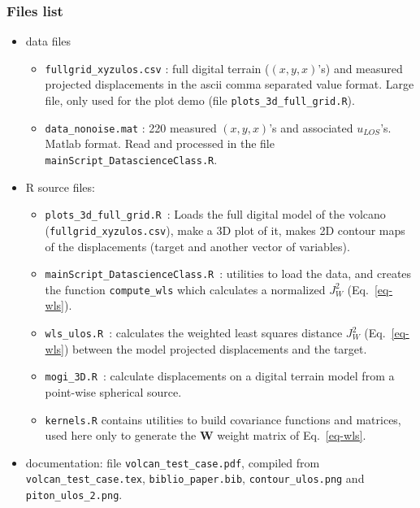 \documentclass[12pt]{article}
\newcommand{\enm}[1]{\ensuremath{#1}\xspace}
\newcommand{\mat}[1]{\enm{\boldsymbol{\mathbf{#1}}}}
\begin{document}
	\subsubsection{Files list}
	\begin{itemize}
	\item data files
	\begin{itemize}
	\item \texttt{fullgrid\_xyzulos.csv} : full digital terrain ($(x,y,x)$'s) and measured projected displacements in the ascii comma separated value format. Large file, only used for the plot demo (file \texttt{plots\_3d\_full\_grid.R}).
	\item \texttt{data\_nonoise.mat} : 220 measured $(x,y,x)$'s and associated $u_{LOS}$'s. Matlab format. Read and processed in the file 
	\texttt{mainScript\_DatascienceClass.R}.
	\end{itemize}
	\item R source files:
	\begin{itemize}
	\item \texttt{plots\_3d\_full\_grid.R}~: Loads the full digital model of the volcano (\texttt{fullgrid\_xyzulos.csv}), make a 3D plot of it, makes 2D contour maps of the displacements (target and another vector of variables).
	\item \texttt{mainScript\_DatascienceClass.R}~: utilities to load the data, and creates the function \texttt{compute\_wls} which calculates a 
	normalized $J^2_W$ (Eq.~\ref{eq-wls}).
	\item \texttt{wls\_ulos.R}~: calculates the weighted least squares distance $J^2_W$ (Eq.~\ref{eq-wls}) between the model projected displacements and the target.
	\item \texttt{mogi\_3D.R}~: calculate displacements on a digital terrain model from a point-wise spherical source.
	\item \texttt{kernels.R} contains utilities to build covariance functions and matrices, used here only to generate the \mat{W} weight matrix of Eq.~\ref{eq-wls}.
	\end{itemize}
	\item documentation: file \texttt{volcan\_test\_case.pdf}, compiled from \texttt{volcan\_test\_case.tex}, \texttt{biblio\_paper.bib}, 
	\texttt{contour\_ulos.png} and \texttt{piton\_ulos\_2.png}.
	\end{itemize}

	\begin{center}
\end{center}
\end{document}
